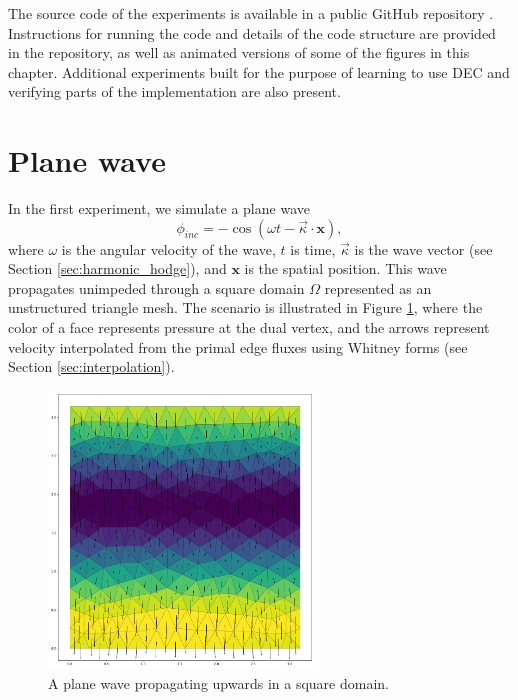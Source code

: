 \documentclass[utf8,english]{gradu3}
\begin{document}
The source code of the experiments is available
in a public GitHub repository \parencite{myyra_wavepool_2023}.
Instructions for running the code
and details of the code structure are provided in the repository,
as well as animated versions of some of the figures in this chapter.
Additional experiments built for the purpose of learning to use DEC
and verifying parts of the implementation are also present.


\section{Plane wave}

In the first experiment, we simulate a plane wave
\begin{equation}\label{eq:incident_plane_wave}
  \phi_{inc} = -\cos(\omega t - \vec{\kappa} \cdot \mathbf{x}),
\end{equation}
where $\omega$ is the angular velocity of the wave,
$t$ is time, $\vec{\kappa}$ is the wave vector (see Section \ref{sec:harmonic_hodge}),
and $\mathbf{x}$ is the spatial position.
This wave propagates unimpeded through a square domain $\Omega$
represented as an unstructured triangle mesh.
The scenario is illustrated in Figure \ref{fig:plane_wave},
where the color of a face represents pressure at the dual vertex,
and the arrows represent velocity interpolated from the primal edge fluxes
using Whitney forms (see Section \ref{sec:interpolation}).

\begin{figure}[h]
  \centering
  \includegraphics[width=200pt]{thesis/plane_wave.pdf}
  \caption{A plane wave propagating upwards in a square domain.}
  \label{fig:plane_wave}
\end{figure}
\end{document}
